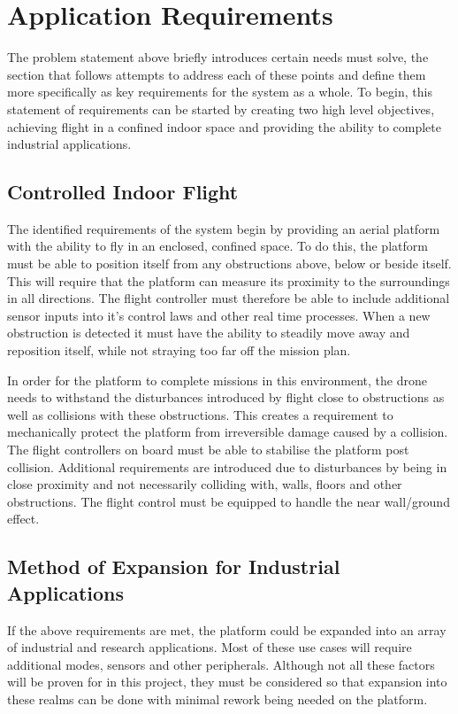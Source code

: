 	\section{Application Requirements}
	The problem statement above briefly introduces certain needs \projectName must solve, the section that follows attempts to address each of these points and define them more specifically as key requirements for the system as a whole. To begin, this statement of requirements can be started by creating two high level objectives, achieving flight in a confined indoor space and providing the ability to complete industrial applications. 
		
		\subsection{Controlled Indoor Flight}
		The identified requirements of the system begin by providing an aerial platform with the ability to fly in an enclosed, confined space. To do this, the platform must be able to position itself from any obstructions above, below or beside itself. This will require that the platform can measure its proximity to the surroundings in all directions. The flight controller must therefore be able to include additional sensor inputs into it's control laws and other real time processes. When a new obstruction is detected it must have the ability to steadily move away and reposition itself, while not straying too far off the mission plan.
		
		In order for the platform to complete missions in this environment, the drone needs to withstand the disturbances introduced by flight close to obstructions as well as collisions with these obstructions. This creates a requirement to mechanically protect the platform from irreversible damage caused by a collision. The flight controllers on board must be able to stabilise the platform post collision. Additional requirements are introduced due to disturbances by being in close proximity and not necessarily colliding with, walls, floors and other obstructions. The flight control must be equipped to handle the near wall/ground effect.
		
		\subsection{Method of Expansion for Industrial Applications}
		If the above requirements are met, the platform could be expanded into an array of industrial and research applications. Most of these use cases will require additional modes, sensors and other peripherals. Although not all these factors will be proven for in this project, they must be considered so that expansion into these realms can be done with minimal rework being needed on the platform.
		
